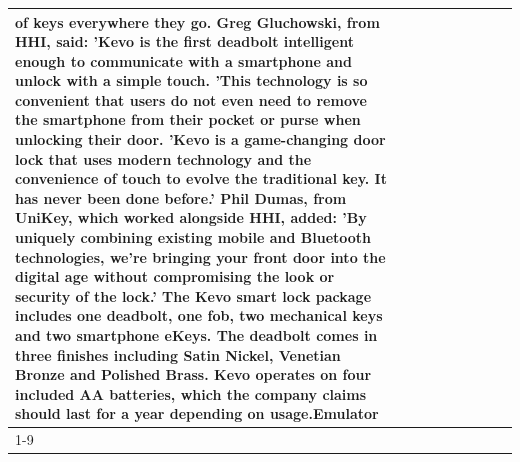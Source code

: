 \begin{table}[H]
\begin{tabular}{lllrlllll}
of keys everywhere they go. Greg Gluchowski, from HHI, said: 'Kevo is the first deadbolt intelligent enough to communicate with a smartphone and unlock with a simple touch. 'This technology is so convenient that users do not even need to remove the smartphone from their pocket or purse when unlocking their door. 'Kevo is a game-changing door lock that uses modern technology and the convenience of touch to evolve the traditional key. It has never been done before.' Phil Dumas, from UniKey, which worked alongside HHI, added: 'By uniquely combining existing mobile and Bluetooth technologies, we’re bringing your front door into the digital age without compromising the look or security of the lock.' The Kevo smart lock package includes one deadbolt, one fob, two mechanical keys and two smartphone eKeys. The deadbolt comes in three finishes including Satin Nickel, Venetian Bronze and Polished Brass. Kevo operates on four included AA batteries, which the company claims should last for a year depending on usage.Emulator \\
\cline{1-9}

\end{tabular}
\end{table}
